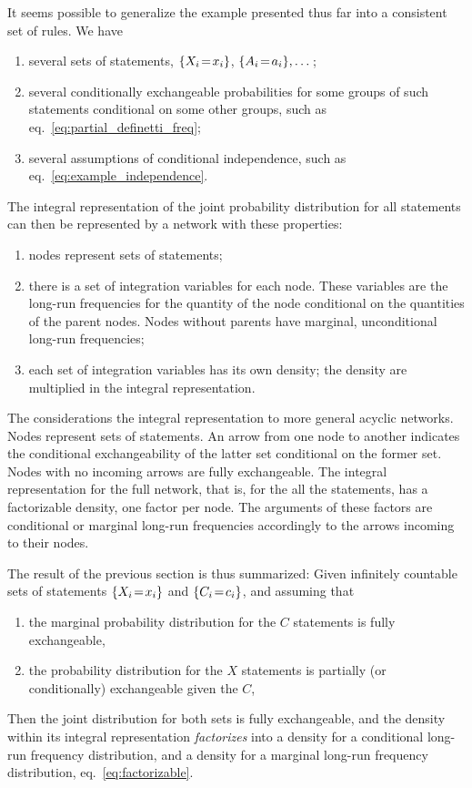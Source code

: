 \documentclass[\ifafour a4paper,12pt,\else a5paper,10pt,\fi%
onecolumn,oneside,article,%
british%
]{memoir}
\theoremstyle{remark}
\theoremstyle{innote}
\DeclarePairedDelimiter\set{\{}{\}}
\renewcommand*{\|}[1][]{\nonscript\,#1\vert\nonscript\,\mathopen{}}
\newcommand*{\eqn}{eq.}%
\renewcommand*{\=}{\TextOrMath\texteq\eq}
\newcommand*{\X}[1]{X_{#1}}
\newcommand*{\x}[1]{x_{#1}}
\newcommand*{\C}[1]{C_{#1}}
\newcommand*{\cc}[1]{c_{#1}}
\newcommand*{\A}[1]{A_{#1}}
\newcommand*{\va}[1]{a_{#1}}
\begin{document}
It seems possible to generalize the example presented thus far into a
consistent set of rules. We have
\begin{enumerate}[label=\roman*.]
\item several sets of statements, $\set{\X{i}\=\x{i}}$,
  $\set{\A{i}\=\va{i}},\dotsc$;
\item several conditionally exchangeable probabilities for some groups of
  such statements conditional on some other groups, such as \eqn~\eqref{eq:partial_definetti_freq};
\item several assumptions of conditional independence, such as
  \eqn~\eqref{eq:example_independence}.
\end{enumerate}
The integral representation of the joint probability distribution for all
statements can then be represented by a network with these properties:
\begin{enumerate}
\item nodes represent sets of statements;
\item there is a set of integration variables for each node. These
  variables are the long-run frequencies for the quantity of the node
  conditional on the quantities of the parent nodes. Nodes without parents
  have marginal, unconditional long-run frequencies;
\item each set of integration variables has its own density; the density
  are multiplied in the integral representation.
\end{enumerate}
The considerations
the integral representation to more general acyclic networks.
Nodes represent sets of statements. An arrow from one node to another
indicates the conditional exchangeability of the latter set conditional on
the former set. Nodes with no incoming arrows are fully exchangeable. The
integral representation for the full network, that is, for the all the
statements, has a factorizable density, one factor per node. The arguments
of these factors are conditional or marginal long-run frequencies
accordingly to the arrows incoming to their nodes.


The result of the previous section is thus summarized: Given infinitely
countable sets of statements $\set{\X{i}\=\x{i}}$ and
$\set{\C{i}\=\cc{i}}$, and assuming that
\begin{enumerate}[wide]
\item the marginal probability distribution for the $C$ statements is fully
  exchangeable,
\item the probability distribution for the $X$ statements is partially (or
  conditionally) exchangeable given the $C$,
\end{enumerate}
Then the joint distribution for both sets is fully exchangeable, and the
density within its integral representation \emph{factorizes} into a density
for a conditional long-run frequency distribution, and a density for a
marginal long-run frequency distribution, \eqn~\eqref{eq:factorizable}.
\end{document}

